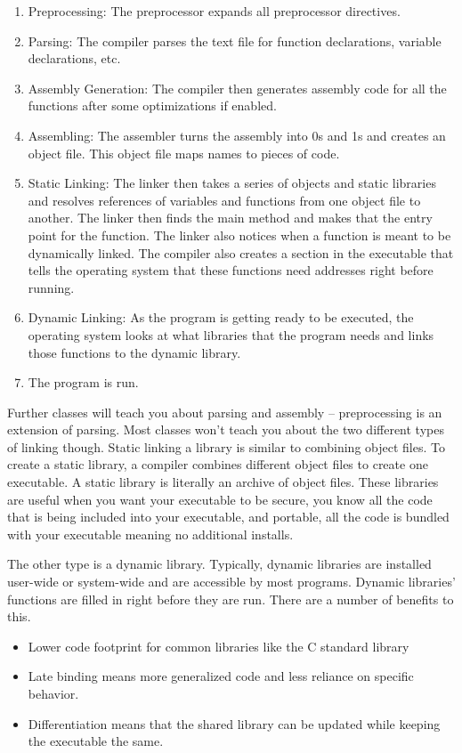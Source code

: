 \begin{enumerate}
\item Preprocessing: The preprocessor expands all preprocessor directives.
\item Parsing: The compiler parses the text file for function declarations, variable declarations, etc.
\item Assembly Generation: The compiler then generates assembly code for all the functions after some optimizations if enabled.
\item Assembling: The assembler turns the assembly into 0s and 1s and creates an object file. This object file maps names to pieces of code.
\item Static Linking: The linker then takes a series of objects and static libraries and resolves references of variables and functions from one object file to another. The linker then finds the main method and makes that the entry point for the function. The linker also notices when a function is meant to be dynamically linked. The compiler also creates a section in the executable that tells the operating system that these functions need addresses right before running. 
\item Dynamic Linking: As the program is getting ready to be executed, the operating system looks at what libraries that the program needs and links those functions to the dynamic library.
\item The program is run.
\end{enumerate}

Further classes will teach you about parsing and assembly -- preprocessing is an extension of parsing.
Most classes won't teach you about the two different types of linking though.
Static linking a library is similar to combining object files.
To create a static library, a compiler combines different object files to create one executable.
A static library is literally an archive of object files.
These libraries are useful when you want your executable to be secure, you know all the code that is being included into your executable, and portable, all the code is bundled with your executable meaning no additional installs.

The other type is a dynamic library.
Typically, dynamic libraries are installed user-wide or system-wide and are accessible by most programs.
Dynamic libraries' functions are filled in right before they are run.
There are a number of benefits to this.

\begin{itemize}
\item Lower code footprint for common libraries like the C standard library
\item Late binding means more generalized code and less reliance on specific behavior.
\item Differentiation means that the shared library can be updated while keeping the executable the same.
\end{itemize}

